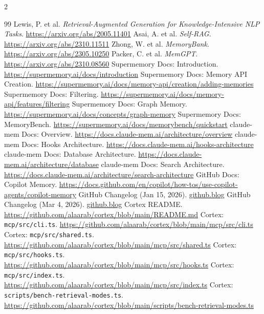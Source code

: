 \documentclass[10pt]{article}
\begin{document}
\vspace{0.3em}
\begin{multicols}{2}
\footnotesize
\setlength{\itemsep}{0pt}
\setlength{\parskip}{0pt}
\sloppy
\begin{thebibliography}{99}
 Lewis, P. et al. \textit{Retrieval-Augmented Generation for Knowledge-Intensive NLP Tasks}. \url{https://arxiv.org/abs/2005.11401}
 Asai, A. et al. \textit{Self-RAG}. \url{https://arxiv.org/abs/2310.11511}
 Zhong, W. et al. \textit{MemoryBank}. \url{https://arxiv.org/abs/2305.10250}
 Packer, C. et al. \textit{MemGPT}. \url{https://arxiv.org/abs/2310.08560}
 Supermemory Docs: Introduction. \url{https://supermemory.ai/docs/introduction}
 Supermemory Docs: Memory API Creation. \url{https://supermemory.ai/docs/memory-api/creation/adding-memories}
 Supermemory Docs: Filtering. \url{https://supermemory.ai/docs/memory-api/features/filtering}
 Supermemory Docs: Graph Memory. \url{https://supermemory.ai/docs/concepts/graph-memory}
 Supermemory Docs: MemoryBench. \url{https://supermemory.ai/docs/memorybench/quickstart}
 claude-mem Docs: Overview. \url{https://docs.claude-mem.ai/architecture/overview}
 claude-mem Docs: Hooks Architecture. \url{https://docs.claude-mem.ai/hooks-architecture}
 claude-mem Docs: Database Architecture. \url{https://docs.claude-mem.ai/architecture/database}
 claude-mem Docs: Search Architecture. \url{https://docs.claude-mem.ai/architecture/search-architecture}
 GitHub Docs: Copilot Memory. \url{https://docs.github.com/en/copilot/how-tos/use-copilot-agents/copilot-memory}
 GitHub Changelog (Jan 15, 2026). \href{https://github.blog/changelog/2026-01-15-agentic-memory-for-github-copilot-is-in-public-preview/}{github.blog}
 GitHub Changelog (Mar 4, 2026). \href{https://github.blog/changelog/2026-03-04-copilot-memory-now-on-by-default-for-pro-and-pro-users-in-public-preview/}{github.blog}
 Cortex README. \url{https://github.com/alaarab/cortex/blob/main/README.md}
 Cortex: \texttt{mcp/src/cli.ts}. \url{https://github.com/alaarab/cortex/blob/main/mcp/src/cli.ts}
 Cortex: \texttt{mcp/src/shared.ts}. \url{https://github.com/alaarab/cortex/blob/main/mcp/src/shared.ts}
 Cortex: \texttt{mcp/src/hooks.ts}. \url{https://github.com/alaarab/cortex/blob/main/mcp/src/hooks.ts}
 Cortex: \texttt{mcp/src/index.ts}. \url{https://github.com/alaarab/cortex/blob/main/mcp/src/index.ts}
 Cortex: \texttt{scripts/bench-retrieval-modes.ts}. \url{https://github.com/alaarab/cortex/blob/main/scripts/bench-retrieval-modes.ts}
\end{thebibliography}
\end{multicols}
\end{document}
